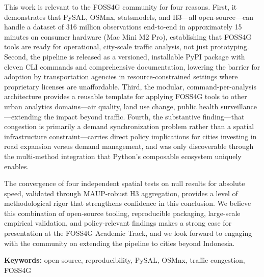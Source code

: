 \documentclass[11pt,a4paper]{article}
\begin{document}
\medskip
This work is relevant to the FOSS4G community for four reasons. First, it demonstrates that PySAL, OSMnx, statsmodels, and H3---all open-source---can handle a dataset of 316 million observations end-to-end in approximately 15 minutes on consumer hardware (Mac Mini M2 Pro), establishing that FOSS4G tools are ready for operational, city-scale traffic analysis, not just prototyping. Second, the pipeline is released as a versioned, installable PyPI package with eleven CLI commands and comprehensive documentation, lowering the barrier for adoption by transportation agencies in resource-constrained settings where proprietary licenses are unaffordable. Third, the modular, command-per-analysis architecture provides a reusable template for applying FOSS4G tools to other urban analytics domains---air quality, land use change, public health surveillance---extending the impact beyond traffic. Fourth, the substantive finding---that congestion is primarily a demand synchronization problem rather than a spatial infrastructure constraint---carries direct policy implications for cities investing in road expansion versus demand management, and was only discoverable through the multi-method integration that Python's composable ecosystem uniquely enables.

The convergence of four independent spatial tests on null results for absolute speed, validated through MAUP-robust H3 aggregation, provides a level of methodological rigor that strengthens confidence in this conclusion. We believe this combination of open-source tooling, reproducible packaging, large-scale empirical validation, and policy-relevant findings makes a strong case for presentation at the FOSS4G Academic Track, and we look forward to engaging with the community on extending the pipeline to cities beyond Indonesia.

\medskip
\noindent\textbf{Keywords:} open-source, reproducibility, PySAL, OSMnx, traffic congestion,  FOSS4G
\end{document}
